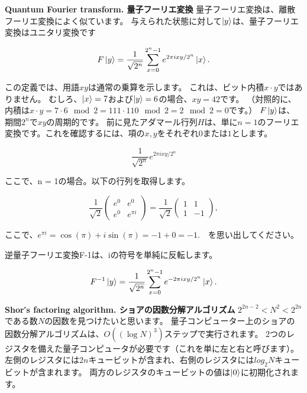 \textbf{Quantum Fourier transform. 量子フーリエ変換}
量子フーリエ変換は、離散フーリエ変換によく似ています。 与えられた状態に対して$\ket{y}$は、量子フーリエ変換はユニタリ変換です

\begin{equation}
\label{104}
F \ket{y}
=
\frac{1}{\sqrt{2^n}}
\sum_{x=0}^{2^n -1}
e^{2 \pi i xy / 2^n} \ket{x}.
\end{equation}

この定義では、用語$xy$は通常の乗算を示します。 これは、ビット内積$x \cdot y$ではありません。 むしろ、$\ket{x}= 7$および$ \ket{y} = 6$の場合、$xy = 42$です。
（対照的に、内積は$x \cdot y = 7 \cdot 6 \mod 2 = 111 \cdot 110 \mod 2 = 2 \mod 2 = 0$です。）
$F \ket{y}$は、期間$2^n$で$xy$の周期的です。 前に見たアダマール行列$H$は、単に$n = 1$のフーリエ変換です。これを確認するには、項の$x,y$をそれぞれ$0$または$1$とします。 

\begin{equation}
\label{105}
\frac{1}{\sqrt{2^n}}
e^{2 \pi i xy / 2^n} 
\end{equation}

ここで、n = 1の場合。以下の行列を取得します。

\begin{equation}
\label{106}
\frac{1}{\sqrt{2}}
\left( \begin{array}{cc}
 e^0 & e^0 \\
 e^0 & e^{\pi i}
\end{array} \right) 
=
\frac{1}{\sqrt{2}}
\left( \begin{array}{cc}
 1 & 1 \\
 1 & -1
\end{array} \right),
\end{equation}

ここで、$e^{\pi i} = \cos(\pi) + i \sin (\pi) = -1 + 0 = -1. $　を思い出してください。

逆量子フーリエ変換F-1は、iの符号を単純に反転します。

\begin{equation}
\label{107}
F^{-1} \ket{y}
=
\frac{1}{\sqrt{2^n}}
\sum_{x=0}^{2^n -1}
e^{- 2 \pi i xy / 2^n} \ket{x}.
\end{equation}


\textbf{Shor′s factoring algorithm. ショアの因数分解アルゴリズム}
$2^{2n-2}  < N^2 < 2^{2n}$である数$N$の因数を見つけたいと思います。
量子コンピューター上のショアの因数分解アルゴリズムは、$O (( \log N)^3)$ステップで実行されます。
2つのレジスタを備えた量子コンピュータが必要です（これを単に左と右と呼びます）。
左側のレジスタには$2n$キュービットが含まれ、右側のレジスタには$log_2 N$キュービットが含まれます。 両方のレジスタのキュービットの値は$\ket{0}$に初期化されます。

